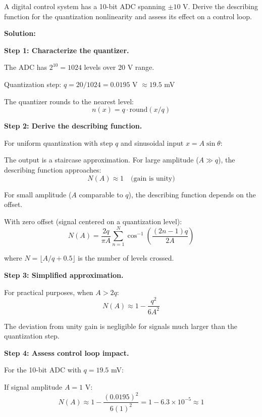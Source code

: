 \begin{example}
\label{ex:quantizer_df}
A digital control system has a 10-bit ADC spanning $\pm 10$ V. Derive the describing function for the quantization nonlinearity and assess its effect on a control loop.

\textbf{Solution:}

\textbf{Step 1: Characterize the quantizer.}

The ADC has $2^{10} = 1024$ levels over 20 V range.

Quantization step: $q = 20/1024 = 0.0195$ V $\approx 19.5$ mV

The quantizer rounds to the nearest level:
\begin{equation}
n(x) = q \cdot \text{round}(x/q)
\end{equation}

\textbf{Step 2: Derive the describing function.}

For uniform quantization with step $q$ and sinusoidal input $x = A\sin\theta$:

The output is a staircase approximation. For large amplitude ($A \gg q$), the describing function approaches:
\begin{equation}
N(A) \approx 1 \quad \text{(gain is unity)}
\end{equation}

For small amplitude ($A$ comparable to $q$), the describing function depends on the offset.

With zero offset (signal centered on a quantization level):
\begin{equation}
N(A) = \frac{2q}{\pi A}\sum_{n=1}^{N} \cos^{-1}\left(\frac{(2n-1)q}{2A}\right)
\end{equation}

where $N = \lfloor A/q + 0.5 \rfloor$ is the number of levels crossed.

\textbf{Step 3: Simplified approximation.}

For practical purposes, when $A > 2q$:
\begin{equation}
N(A) \approx 1 - \frac{q^2}{6A^2}
\end{equation}

The deviation from unity gain is negligible for signals much larger than the quantization step.

\textbf{Step 4: Assess control loop impact.}

For the 10-bit ADC with $q = 19.5$ mV:

If signal amplitude $A = 1$ V:
\begin{equation}
N(A) \approx 1 - \frac{(0.0195)^2}{6(1)^2} = 1 - 6.3 \times 10^{-5} \approx 1
\end{equation}


\end{example}
